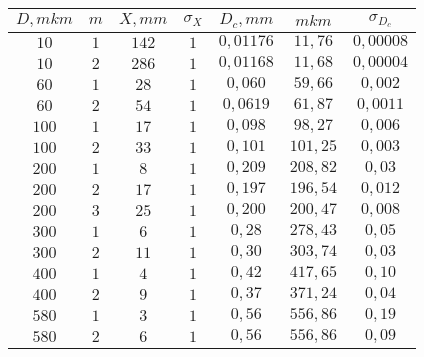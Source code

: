 \begin{tabular}{| c | c | c | c | c | c | c |}
\hline
$D, mkm$ & $m$ & $X, mm$ & $\sigma_X$ & $D_c, mm$ & $mkm$ & $\sigma_{D_c}$\\
\hline
$10$ & $1$ & $142$ & $1$ & $0,01176$ & $11,76$ & $0,00008$\\
\hline
$10$ & $2$ & $286$ & $1$ & $0,01168$ & $11,68$ & $0,00004$\\
\hline
$60$ & $1$ & $28$ & $1$ & $0,060$ & $59,66$ & $0,002$\\
\hline
$60$ & $2$ & $54$ & $1$ & $0,0619$ & $61,87$ & $0,0011$\\
\hline
$100$ & $1$ & $17$ & $1$ & $0,098$ & $98,27$ & $0,006$\\
\hline
$100$ & $2$ & $33$ & $1$ & $0,101$ & $101,25$ & $0,003$\\
\hline
$200$ & $1$ & $8$ & $1$ & $0,209$ & $208,82$ & $0,03$\\
\hline
$200$ & $2$ & $17$ & $1$ & $0,197$ & $196,54$ & $0,012$\\
\hline
$200$ & $3$ & $25$ & $1$ & $0,200$ & $200,47$ & $0,008$\\
\hline
$300$ & $1$ & $6$ & $1$ & $0,28$ & $278,43$ & $0,05$\\
\hline
$300$ & $2$ & $11$ & $1$ & $0,30$ & $303,74$ & $0,03$\\
\hline
$400$ & $1$ & $4$ & $1$ & $0,42$ & $417,65$ & $0,10$\\
\hline
$400$ & $2$ & $9$ & $1$ & $0,37$ & $371,24$ & $0,04$\\
\hline
$580$ & $1$ & $3$ & $1$ & $0,56$ & $556,86$ & $0,19$\\
\hline
$580$ & $2$ & $6$ & $1$ & $0,56$ & $556,86$ & $0,09$\\
\hline
\end{tabular}
